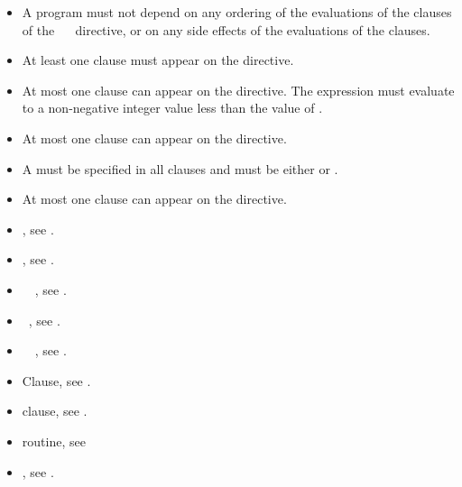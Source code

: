\restrictions
\begin{itemize}
\item A program must not depend on any ordering of the evaluations of the clauses of the ~~ directive, or on any side effects of the evaluations of the clauses.
\item At least one  clause must appear on the directive.

\item At most one  clause can appear on the
  directive. The  expression must evaluate to a
  non-negative integer value less than the value of
  .

\item At most one  clause can appear on the directive.
\item A  must be specified in all  clauses and must be either  or .
\item At most one  clause can appear on the directive.
\end{itemize}

\crossreferences
\begin{itemize}
\item {}, see .

\item {}, see .

\item {}~~,
      see .

\item {}~, see .

\item {}~~,
      see .

\item {} Clause, see .

\item {} clause, see .

\item {} routine, see 

\item {}, see
.

\end{itemize}





